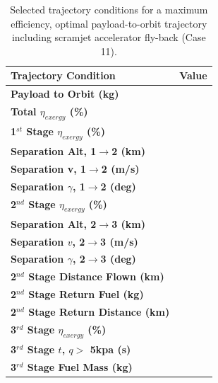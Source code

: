 \begin{table}[ht] %
	\centering
	\begin{tabular}{l c } 
		\hline \textbf{Trajectory Condition}
		&Value 
		\\
		\hline \textbf{Payload to Orbit (kg)}
		& \textbf{\PayloadToOrbitStandard}
		\\
		\textbf{Total $\eta_{exergy}$ (\%)}
		& \textbf{\totalExergyEffStandard}
		\\
		\hline 
		\textbf{1$^{st}$ Stage $\eta_{exergy}$ (\%)}
		& \textbf{\firstExergyEffStandard}
		\\
		
		\textbf{Separation Alt, 1$\rightarrow$2 (km)}
		& \firstsecondSeparationAltStandard
		\\
		\textbf{Separation v, 1$\rightarrow$2 (m/s)}
		& \firstsecondSeparationvStandard
		\\
		\textbf{Separation $\gamma$, 1$\rightarrow$2 (deg)}
		& \firstsecondSeparationgammaStandard
		\\
		\hline 
		\textbf{2$^{nd}$ Stage $\eta_{exergy}$ (\%)}
		& \textbf{\secondExergyEffStandard}
		\\
		
		\textbf{Separation Alt, 2$\rightarrow$3 (km)}
		& \secondthirdSeparationAltStandard
		\\
		\textbf{Separation $v$, 2$\rightarrow$3 (m/s)}
		& \secondthirdSeparationvStandard
		\\
		\textbf{Separation $\gamma$, 2$\rightarrow$3 (deg)}
		& \secondthirdSeparationgammaStandard
		\\
		
		\textbf{2$^{nd}$ Stage Distance Flown (km)}
		& \SecondDistStandard
		\\
		\textbf{2$^{nd}$ Stage Return Fuel (kg)}
		& \returnFuelStandard
		\\
		\textbf{2$^{nd}$ Stage Return Distance (km)}
		& \returnDistStandard
		\\
		\hline 
		\textbf{3$^{rd}$ Stage $\eta_{exergy}$ (\%)}
		& \textbf{\thirddExergyEffStandard}
		\\
		
		\textbf{3$^{rd}$ Stage $t$, $q >$ 5kpa (s)}
		& \thirdqOverFiveStandard
		\\
		\textbf{3$^{rd}$ Stage Fuel Mass (kg)}
		& \thirdmFuelStandard
		\\
		\hline 
	\end{tabular} 
	\caption{Selected trajectory conditions for a maximum efficiency, optimal payload-to-orbit trajectory including scramjet accelerator fly-back (Case 11).}
\end{table}


